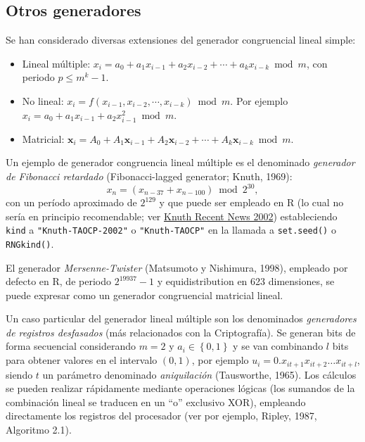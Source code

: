 \documentclass[
]{book}
\theoremstyle{break}
\theoremstyle{definition}
\theoremstyle{definition}
\theoremstyle{definition}
\theoremstyle{remark}
\begin{document}
\hypertarget{otros-generadores}{%
\subsection{Otros generadores}\label{otros-generadores}}

Se han considerado diversas extensiones del generador congruencial lineal simple:

\begin{itemize}
\item
  Lineal múltiple:
  \(x_{i}= a_0 + a_1 x_{i-1} + a_2 x_{i-2} + \cdots + a_{k} x_{i-k} \bmod m\),
  con periodo \(p\leq m^{k}-1\).
\item
  No lineal:
  \(x_{i} = f\left( x_{i-1}, x_{i-2}, \cdots, x_{i-k} \right) \bmod m\).
  Por ejemplo \(x_{i} = a_0 + a_1 x_{i-1} + a_2 x_{i-1}^2 \bmod m\).
\item
  Matricial:
  \(\boldsymbol{x}_{i} = A_0 + A_1\boldsymbol{x}_{i-1} + A_2\boldsymbol{x}_{i-2} + \cdots + A_{k}\boldsymbol{x}_{i-k} \bmod m\).
\end{itemize}

Un ejemplo de generador congruencia lineal múltiple es el denominado \emph{generador de Fibonacci retardado} (Fibonacci-lagged generator; Knuth, 1969):
\[x_n = (x_{n-37} + x_{n-100}) \bmod 2^{30},\]
con un período aproximado de \(2^{129}\) y que puede ser empleado en R (lo cual no sería en principio recomendable; ver \href{https://www-cs-faculty.stanford.edu/~knuth/news02.html\#rng}{Knuth Recent News 2002}) estableciendo \texttt{kind} a \texttt{"Knuth-TAOCP-2002"} o \texttt{"Knuth-TAOCP"} en la llamada a \texttt{set.seed()} o \texttt{RNGkind()}.

El generador \emph{Mersenne-Twister} (Matsumoto y Nishimura, 1998), empleado por defecto en R, de periodo \(2^{19937}-1\) y equidistribution en 623 dimensiones, se puede expresar como un generador congruencial matricial lineal.

Un caso particular del generador lineal múltiple son los denominados \emph{generadores de registros desfasados} (más relacionados con la Criptografía).
Se generan bits de forma secuencial considerando \(m=2\) y \(a_{i} \in \left \{ 0,1\right \}\) y se van combinando \(l\) bits para obtener valores en el intervalo \((0, 1)\), por ejemplo \(u_i = 0 . x_{it+1} x_{it+2} \ldots x_{it+l}\), siendo \(t\) un parámetro denominado \emph{aniquilación} (Tausworthe, 1965).
Los cálculos se pueden realizar rápidamente mediante operaciones lógicas (los sumandos de la combinación lineal se traducen en un ``o'' exclusivo XOR), empleando directamente los registros del procesador (ver por ejemplo, Ripley, 1987, Algoritmo 2.1).
\end{document}
